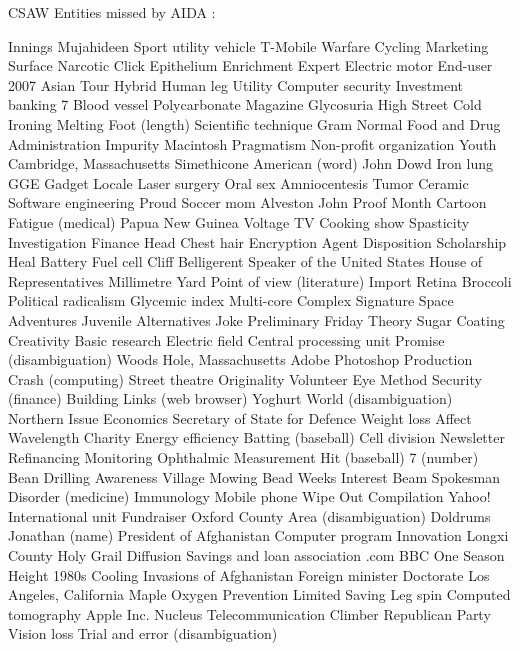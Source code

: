 CSAW Entities missed by AIDA : 
  
Innings  Mujahideen  Sport utility vehicle  
T-Mobile  Warfare  Cycling  
Marketing  Surface  Narcotic  
Click  Epithelium  Enrichment  
Expert  Electric motor  End-user  
2007 Asian Tour  Hybrid  Human leg  
Utility  Computer security  Investment banking  
7  Blood vessel  Polycarbonate  
Magazine  Glycosuria  High Street  
Cold Ironing  Melting  Foot (length)  
Scientific technique  Gram  Normal  
Food and Drug Administration  Impurity  Macintosh  
Pragmatism  Non-profit organization  Youth  
Cambridge, Massachusetts  Simethicone  American (word)  
John Dowd  Iron lung  GGE  
Gadget  Locale  Laser surgery  
Oral sex  Amniocentesis  Tumor  
Ceramic  Software engineering  Proud  
Soccer mom  Alveston  John  
Proof  Month  Cartoon  
Fatigue (medical)  Papua New Guinea  Voltage  
TV Cooking show  Spasticity  Investigation  
Finance  Head  Chest hair  
Encryption  Agent  Disposition  
Scholarship  Heal  Battery  
Fuel cell  Cliff  Belligerent  
Speaker of the United States House of Representatives  Millimetre  Yard  
Point of view (literature)  Import  Retina  
Broccoli  Political radicalism  Glycemic index  
Multi-core  Complex  Signature  
Space Adventures  Juvenile  Alternatives  
Joke  Preliminary  Friday  
Theory  Sugar  Coating  
Creativity  Basic research  Electric field  
Central processing unit  Promise (disambiguation)  Woods Hole, Massachusetts  
Adobe Photoshop  Production  Crash (computing)  
Street theatre  Originality  Volunteer  
Eye  Method  Security (finance)  
Building  Links (web browser)  Yoghurt  
World (disambiguation)  Northern  Issue  
Economics  Secretary of State for Defence  Weight loss  
Affect  Wavelength  Charity  
Energy efficiency  Batting (baseball)  Cell division  
Newsletter  Refinancing  Monitoring  
Ophthalmic  Measurement  Hit (baseball)  
7 (number)  Bean  Drilling  
Awareness  Village  Mowing  
Bead  Weeks  Interest  
Beam  Spokesman  Disorder (medicine)  
Immunology  Mobile phone  Wipe Out  
Compilation  Yahoo!  International unit  
Fundraiser  Oxford County  Area (disambiguation)  
Doldrums  Jonathan (name)  President of Afghanistan  
Computer program  Innovation  Longxi County  
Holy Grail  Diffusion  Savings and loan association  
.com  BBC One  Season  
Height  1980s  Cooling  
Invasions of Afghanistan  Foreign minister  Doctorate  
Los Angeles, California  Maple  Oxygen  
Prevention  Limited  Saving  
Leg spin  Computed tomography  Apple Inc.  
Nucleus  Telecommunication  Climber  
Republican Party  Vision loss  Trial and error (disambiguation)  
